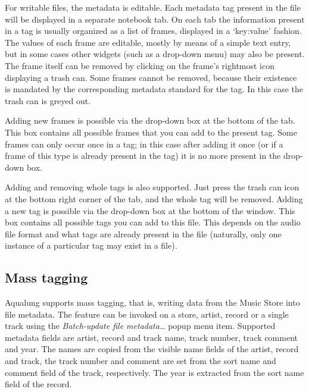 \documentclass[10pt,english]{article}
\begin{document}
For writable files, the metadata is editable. Each metadata
tag present in the file will be displayed in a separate
notebook tab. On each tab the information present in a tag is
usually organized as a list of frames, displayed in a
`key:value' fashion. The values of each frame are
editable, mostly by means of a simple text entry, but in some
cases other widgets (such as a drop-down menu) may also be
present. The frame itself can be removed by clicking on the
frame's rightmost icon displaying a trash can. Some frames
cannot be removed, because their existence is mandated by the
corresponding metadata standard for the tag. In this case the
trash can is greyed out.




Adding new frames is possible via the drop-down box at the
bottom of the tab. This box contains all possible frames that
you can add to the present tag. Some frames can only occur
once in a tag; in this case after adding it once (or if a
frame of this type is already present in the tag) it is no
more present in the drop-down box.




Adding and removing whole tags is also supported. Just
press the trash can icon at the bottom right corner of the
tab, and the whole tag will be removed. Adding a new tag is
possible via the drop-down box at the bottom of the
window. This box contains all possible tags you can add to
this file. This depends on the audio file format and what tags
are already present in the file (naturally, only one instance
of a particular tag may exist in a file).




\subsection{Mass tagging\label{idp704640}}



\noindent Aqualung supports mass tagging, that is, writing data from
the Music Store into file metadata. The feature can be invoked
on a store, artist, record or a single track using the
\textsl{Batch-update file metadata\dots{}} popup menu
item. Supported metadata fields are artist, record and track
name, track number, track comment and year. The names are
copied from the visible name fields of the artist, record and
track, the track number and comment are set from the sort name
and comment field of the track, respectively. The year is
extracted from the sort name field of the record.
\end{document}
